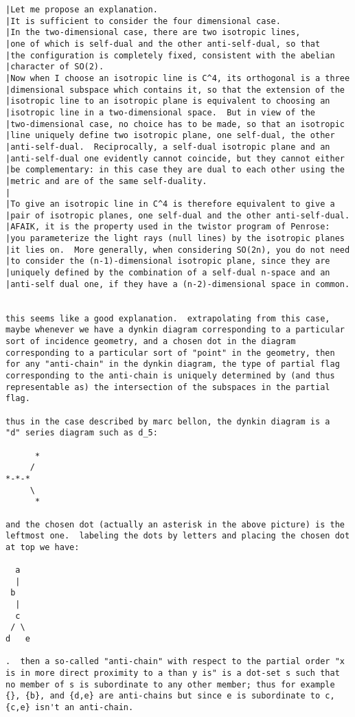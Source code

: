 \begin{verbatim}
|Let me propose an explanation.
|It is sufficient to consider the four dimensional case.
|In the two-dimensional case, there are two isotropic lines,
|one of which is self-dual and the other anti-self-dual, so that 
|the configuration is completely fixed, consistent with the abelian 
|character of SO(2).
|Now when I choose an isotropic line is C^4, its orthogonal is a three
|dimensional subspace which contains it, so that the extension of the
|isotropic line to an isotropic plane is equivalent to choosing an 
|isotropic line in a two-dimensional space.  But in view of the 
|two-dimensional case, no choice has to be made, so that an isotropic
|line uniquely define two isotropic plane, one self-dual, the other
|anti-self-dual.  Reciprocally, a self-dual isotropic plane and an 
|anti-self-dual one evidently cannot coincide, but they cannot either 
|be complementary: in this case they are dual to each other using the 
|metric and are of the same self-duality.
|
|To give an isotropic line in C^4 is therefore equivalent to give a
|pair of isotropic planes, one self-dual and the other anti-self-dual.
|AFAIK, it is the property used in the twistor program of Penrose:
|you parameterize the light rays (null lines) by the isotropic planes
|it lies on.  More generally, when considering SO(2n), you do not need 
|to consider the (n-1)-dimensional isotropic plane, since they are 
|uniquely defined by the combination of a self-dual n-space and an
|anti-self dual one, if they have a (n-2)-dimensional space in common.


this seems like a good explanation.  extrapolating from this case,
maybe whenever we have a dynkin diagram corresponding to a particular
sort of incidence geometry, and a chosen dot in the diagram
corresponding to a particular sort of "point" in the geometry, then
for any "anti-chain" in the dynkin diagram, the type of partial flag
corresponding to the anti-chain is uniquely determined by (and thus
representable as) the intersection of the subspaces in the partial
flag.

thus in the case described by marc bellon, the dynkin diagram is a
"d" series diagram such as d_5:

      *
     /
*-*-*
     \
      *

and the chosen dot (actually an asterisk in the above picture) is the
leftmost one.  labeling the dots by letters and placing the chosen dot
at top we have:

  a
  |
 b
  |
  c
 / \
d   e

.  then a so-called "anti-chain" with respect to the partial order "x
is in more direct proximity to a than y is" is a dot-set s such that
no member of s is subordinate to any other member; thus for example
{}, {b}, and {d,e} are anti-chains but since e is subordinate to c,
{c,e} isn't an anti-chain.


\end{verbatim}
